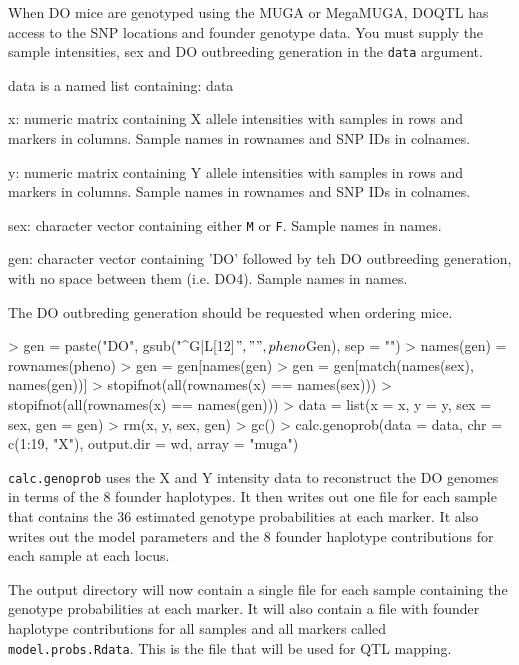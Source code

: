 \documentclass{article}
\begin{document}
When DO mice are genotyped using the MUGA or MegaMUGA, DOQTL has access to the SNP locations and 
founder genotype data. You must supply the sample intensities, sex and DO outbreeding generation
in the \texttt{data} argument. 

data is a named list containing:
data\begin{description}
  \item{x: numeric matrix containing X allele intensities with samples in rows and markers in columns. Sample names in rownames and SNP IDs in colnames.}
  \item{y: numeric matrix containing Y allele intensities with samples in rows and markers in columns. Sample names in rownames and SNP IDs in colnames.}
  \item{sex: character vector containing either \texttt{M} or \texttt{F}. Sample names in names.}
  \item{gen: character vector containing 'DO' followed by teh DO outbreeding generation, with no space between them (i.e. DO4). Sample names in names.}
\end{description}

The DO outbreding generation should be requested when ordering mice.

\begin{Schunk}
\begin{Sinput}
> gen = paste("DO", gsub("^G|L[12]$", "", pheno$Gen), sep = "")
> names(gen) = rownames(pheno)
> gen = gen[names(gen) %
> gen = gen[match(names(sex), names(gen))]
> stopifnot(all(rownames(x) == names(sex)))
> stopifnot(all(rownames(x) == names(gen)))
> data = list(x = x, y = y, sex = sex, gen = gen)
> rm(x, y, sex, gen)
> gc()
> calc.genoprob(data = data, chr = c(1:19, "X"), output.dir = wd, array = "muga")
\end{Sinput}
\end{Schunk}

\texttt{calc.genoprob} uses the X and Y intensity data to reconstruct the DO genomes in terms 
of the 8 founder haplotypes. It then writes out one file for each sample that contains the 36
estimated genotype probabilities at each marker. It also writes out the model parameters and 
the 8 founder haplotype contributions for each sample at each locus.

\vspace{5 mm}

The output directory will now contain a single file for each sample containing the genotype probabilities at each marker. It will also contain a file with founder haplotype contributions for all samples and all markers called \texttt{model.probs.Rdata}. This is the file that will be used for QTL mapping.
\end{document}
